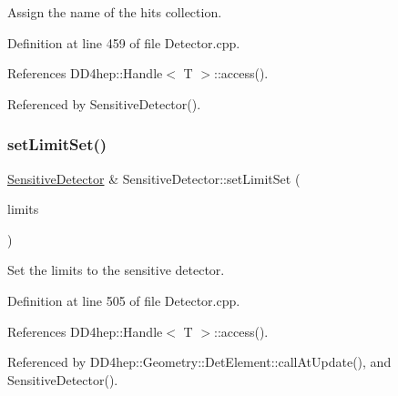 Assign the name of the hits collection. 



Definition at line 459 of file Detector.\+cpp.



References D\+D4hep\+::\+Handle$<$ T $>$\+::access().



Referenced by Sensitive\+Detector().

\hypertarget{class_d_d4hep_1_1_geometry_1_1_sensitive_detector_a24994b8d62969f2d16e1cdf543a8e9bc}{}\label{class_d_d4hep_1_1_geometry_1_1_sensitive_detector_a24994b8d62969f2d16e1cdf543a8e9bc} 
\subsubsection{\texorpdfstring{set\+Limit\+Set()}{setLimitSet()}}
{\footnotesize\ttfamily \hyperlink{class_d_d4hep_1_1_geometry_1_1_sensitive_detector}{Sensitive\+Detector} \& Sensitive\+Detector\+::set\+Limit\+Set (\begin{DoxyParamCaption}\item[{\hyperlink{class_d_d4hep_1_1_geometry_1_1_limit_set}{Limit\+Set}}]{limits }\end{DoxyParamCaption})}



Set the limits to the sensitive detector. 



Definition at line 505 of file Detector.\+cpp.



References D\+D4hep\+::\+Handle$<$ T $>$\+::access().



Referenced by D\+D4hep\+::\+Geometry\+::\+Det\+Element\+::call\+At\+Update(), and Sensitive\+Detector().

\hypertarget{class_d_d4hep_1_1_geometry_1_1_sensitive_detector_a8f7a8a0c01fbddbfd645d19171d78f22}{}\label{class_d_d4hep_1_1_geometry_1_1_sensitive_detector_a8f7a8a0c01fbddbfd645d19171d78f22} 
